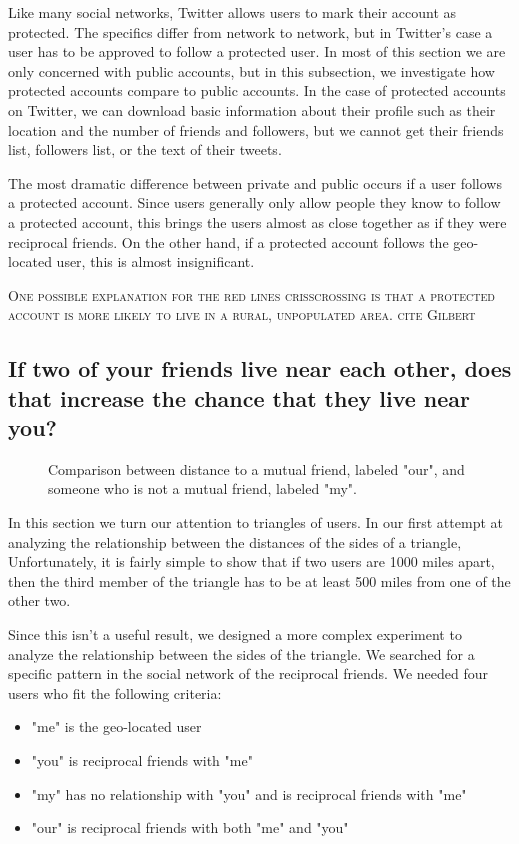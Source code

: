 \documentclass{sig-alternate}
\begin{document}
Like many social networks, Twitter allows users to mark their account as protected. The specifics differ from network to network, but in Twitter's case a user has to be approved to follow a protected user.
In most of this section we are only concerned with public accounts, but in this subsection, we investigate how protected accounts compare to public accounts.
In the case of protected accounts on Twitter, we can download basic information
about their profile such as their location and the number of friends and
followers, but we cannot get their friends list, followers list, or the text of their tweets.

The most dramatic difference between private and public occurs if a user follows a protected account.
Since users generally only allow people they know to follow a protected account, this brings the users almost as close together as if they were reciprocal friends. On the other hand, if a protected account follows the geo-located user, this is almost insignificant.

\textsc{One possible explanation for the red lines crisscrossing is that a
protected account is more likely to live in a rural, unpopulated area. cite
Gilbert}

\subsection{If two of your friends live near each other, does that increase the chance that they live near you?}
\begin{figure}
\centering
{}
\caption{
Comparison between distance to a mutual friend, labeled "our", and someone who is not a mutual friend, labeled "my".
}
\label{fig:NearTriads}
\end{figure}
In this section we turn our attention to triangles of users.
In our first attempt at analyzing the relationship between the distances of the sides of a triangle, 
Unfortunately, it is fairly simple to show that if two users are 1000 miles apart, then the third member of the triangle has to be at least 500 miles from one of the other two.

Since this isn't a useful result, we designed a more complex experiment to analyze the relationship between the sides of the triangle.
We searched for a specific pattern in the social network of the reciprocal friends.  We needed four users who fit the following criteria:
\begin{itemize}
\item "me" is the geo-located user
\item "you" is reciprocal friends with "me"
\item "my" has no relationship with "you" and is reciprocal friends with "me"
\item "our" is reciprocal friends with both "me" and "you"
\end{itemize}
\end{document}
